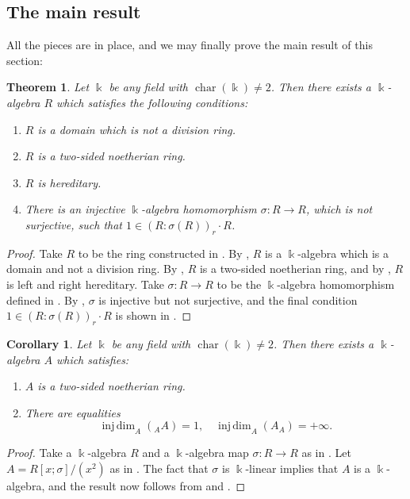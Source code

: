 \documentclass{amsart}
\newtheorem{thm}[equation]{Theorem}
\newtheorem{cor}[equation]{Corollary}
\theoremstyle{definition}
\newcommand{\opn}{\operatorname}
\renewcommand{\k}{\Bbbk}
\newcommand{\injdim}{\operatorname{inj\,dim}}
\numberwithin{equation}{section}
\begin{document}
\subsection{The main result}

All the pieces are in place, and we may finally prove the main result of this section:

\begin{thm}\label{thm:mainR}
Let $\k$ be any field with $\opn{char}(\k) \ne 2$.    
Then there exists a $\k$-algebra $R$ which satisfies the following conditions:
\begin{enumerate}
\item $R$ is a domain which is not a division ring.
\item $R$ is a two-sided noetherian ring.
\item $R$ is hereditary.
\item There is an injective $\k$-algebra homomorphism $\sigma:R \to R$,
which is not surjective, such that $1 \in (R:\sigma(R))_r\cdot R$.
\end{enumerate}
\end{thm}
\begin{proof}
Take $R$ to be the ring constructed in .
By , $R$ is a $\k$-algebra which is a domain and not a division ring.
By , $R$ is a two-sided noetherian ring,
and by , $R$ is left and right hereditary.
Take $\sigma:R \to R$ to be the $\k$-algebra homomorphism defined in . 
By , $\sigma$ is injective but not surjective,
and the final condition $1 \in (R:\sigma(R))_r\cdot R$ is shown in .
\end{proof}

\begin{cor}\label{cor:main}
Let $\k$ be any field with $\opn{char}(\k) \ne 2$.    
Then there exists a $\k$-algebra $A$ which satisfies:
\begin{enumerate}
\item $A$ is a two-sided noetherian ring.
\item There are equalities
\[
\injdim_A({}_A A) = 1, \quad \injdim_A(A_A) = +\infty.
\]
\end{enumerate}
\end{cor}
\begin{proof}
Take a $\k$-algebra $R$ and a $\k$-algebra map $\sigma:R \to R$ as in .
Let $A = R[x;\sigma]/(x^2)$ as in .
The fact that $\sigma$ is $\k$-linear implies that $A$ is a $\k$-algebra,
and the result now follows from  and .
\end{proof}
\end{document}
